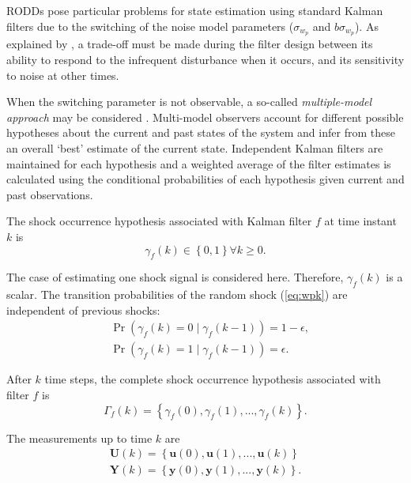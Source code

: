 RODDs pose particular problems for state estimation using standard Kalman filters due to the switching of the noise model parameters ($\sigma_{w_p}$ and $b$$\sigma_{w_p}$). As explained by \cite{robertsonDetectionEstimationRandomly1995a}, a trade-off must be made during the filter design between its ability to respond to the infrequent disturbance when it occurs, and its sensitivity to noise at other times.

When the switching parameter is not observable, a so-called \textit{multiple-model approach} may be considered \citep{buxbaumRecursiveOptimalEstimation1970, jafferEstimationDiscreteProcesses1971}. Multi-model observers account for different possible hypotheses about the current and past states of the system and infer from these an overall `best' estimate of the current state. Independent Kalman filters are maintained for each hypothesis and a weighted average of the filter estimates is calculated using the conditional probabilities of each hypothesis given current and past observations. 

The shock occurrence hypothesis associated with Kalman filter $f$ at time instant $k$ is
\begin{equation} \label{eq:gammak}
	\gamma_{f}(k) \in \left\{0, 1 \right\} \forall{k \ge 0}.
\end{equation}

The case of estimating one shock signal is considered here. Therefore, $\gamma_{f}(k)$ is a scalar. The transition probabilities of the random shock (\ref{eq:wpk}) are independent of previous shocks:
\begin{equation} \label{eq:Pr_gammak_given_gammakm1}
	\begin{aligned}
		& \Pr\left(\gamma_{f}(k)=0 \mid \gamma_{f}(k-1)\right) = 1-\epsilon, \\
		& \Pr\left(\gamma_{f}(k)=1 \mid \gamma_{f}(k-1)\right) = \epsilon.
	\end{aligned}
\end{equation}

After $k$ time steps, the complete shock occurrence hypothesis associated with filter $f$ is
\begin{equation} \label{eq:Gammak}
	\Gamma_f(k) = \left\{\gamma_f(0), \gamma_f(1), ..., \gamma_f(k) \right\}.
\end{equation}

The measurements up to time $k$ are
\begin{equation} \label{eq:Uk_Yk}
	\begin{aligned}
		\mathbf{U}(k)=\left\{\mathbf{u}(0), \mathbf{u}(1), ..., \mathbf{u}(k) \right\} \\
		\mathbf{Y}(k)=\left\{\mathbf{y}(0), \mathbf{y}(1), ..., \mathbf{y}(k) \right\}.
	\end{aligned}
\end{equation}

